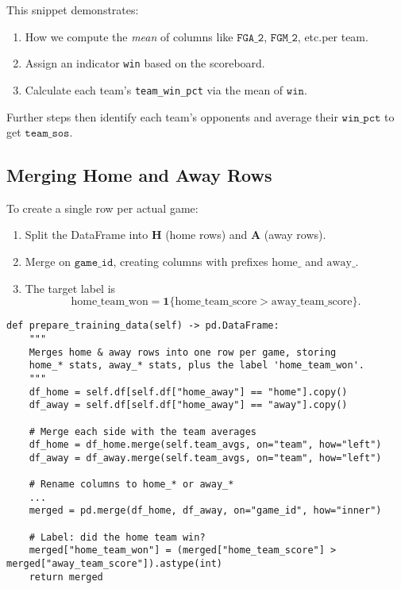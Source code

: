 \documentclass[12pt]{article}
\begin{document}
\noindent
This snippet demonstrates:
\begin{enumerate}[label=\roman*)]
    \item How we compute the \emph{mean} of columns like \(\texttt{FGA\_2}\), \(\texttt{FGM\_2}\), etc.\@ per team.
    \item Assign an indicator \texttt{win} based on the scoreboard.
    \item Calculate each team's \texttt{team\_win\_pct} via the mean of \(\texttt{win}\).
\end{enumerate}
Further steps then identify each team's opponents and average their \(\texttt{win\_pct}\) to get \(\texttt{team\_sos}\).

\subsection{Merging Home and Away Rows}
To create a single row per actual game:
\begin{enumerate}[label=\arabic*)]
    \item Split the DataFrame into \(\mathbf{H}\) (home rows) and \(\mathbf{A}\) (away rows).
    \item Merge on \(\texttt{game\_id}\), creating columns with prefixes \(\text{home\_}\) and \(\text{away\_}\).
    \item The target label is 
    \[
    \text{home\_team\_won} = \mathbf{1}\{\text{home\_team\_score} > \text{away\_team\_score}\}.
    \]
\end{enumerate}

\begin{verbatim}
def prepare_training_data(self) -> pd.DataFrame:
    """
    Merges home & away rows into one row per game, storing
    home_* stats, away_* stats, plus the label 'home_team_won'.
    """
    df_home = self.df[self.df["home_away"] == "home"].copy()
    df_away = self.df[self.df["home_away"] == "away"].copy()

    # Merge each side with the team averages
    df_home = df_home.merge(self.team_avgs, on="team", how="left")
    df_away = df_away.merge(self.team_avgs, on="team", how="left")

    # Rename columns to home_* or away_*
    ...
    merged = pd.merge(df_home, df_away, on="game_id", how="inner")

    # Label: did the home team win?
    merged["home_team_won"] = (merged["home_team_score"] > merged["away_team_score"]).astype(int)
    return merged
\end{verbatim}
\end{document}
